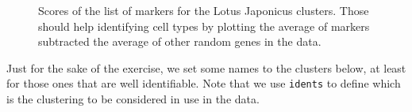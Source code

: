\documentclass[
  letterpaper,
  DIV=11,
  numbers=noendperiod]{scrartcl}
\begin{document}
\begin{figure}[H]


\caption{\label{fig-scores}Scores of the list of markers for the Lotus
Japonicus clusters. Those should help identifying cell types by plotting
the average of markers subtracted the average of other random genes in
the data.}

\end{figure}%

Just for the sake of the exercise, we set some names to the clusters
below, at least for those ones that are well identifiable. Note that we
use \texttt{idents} to define which is the clustering to be considered
in use in the data.
\end{document}
